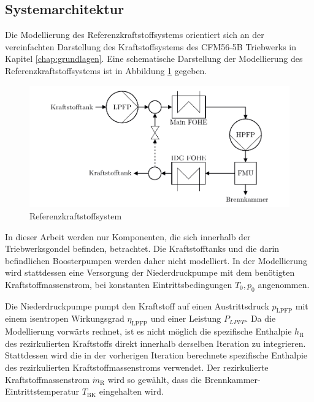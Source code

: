 \subsection{Systemarchitektur}

Die Modellierung des Referenzkraftstoffsystems orientiert sich an der vereinfachten Darstellung des Kraftstoffsystems des CFM56-5B Triebwerks in Kapitel \ref{chap:grundlagen}. Eine schematische Darstellung der Modellierung des Referenzkraftstoffsystems ist in Abbildung \ref{fig:Referenz} gegeben.

\begin{figure}[ht]
\centering
\includegraphics[width=1\linewidth]{4_Abbildungen/2_Hauptteil/Kraftstoffsystem Abbildungen/Referenz.pdf}
  \caption{Referenzkraftstoffsystem}
  \label{fig:Referenz}
\end{figure}
\FloatBarrier 

In dieser Arbeit werden nur Komponenten, die sich innerhalb der Triebwerksgondel befinden, betrachtet. Die Kraftstofftanks und die darin befindlichen Boosterpumpen werden daher nicht modelliert. In der Modellierung wird stattdessen eine Versorgung der Niederdruckpumpe mit dem benötigten Kraftstoffmassenstrom, bei  konstanten Eintrittsbedingungen $T_0, p_0$ angenommen. 

Die Niederdruckpumpe pumpt den Kraftstoff auf einen Austrittsdruck $p_{\mathrm{LPFP}}$ mit einem isentropen Wirkungsgrad $\eta_{\mathrm{LPFP}}$ und einer Leistung $P_{LPFP}$. Da die Modellierung vorwärts rechnet, ist es nicht möglich die spezifische Enthalpie $h_\mathrm{R}$ des rezirkulierten Kraftstoffs direkt innerhalb derselben Iteration zu integrieren. Stattdessen wird die in der vorherigen Iteration berechnete spezifische Enthalpie des rezirkulierten Kraftstoffmassenstroms verwendet. Der rezirkulierte Kraftstoffmassenstrom $\dot{m}_\mathrm{R}$ wird so gewählt, dass die Brennkammer-Eintrittstemperatur $T_{\mathrm{BK}}$ eingehalten wird. 

